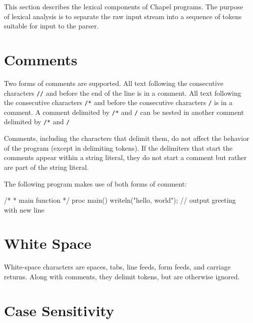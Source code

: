 \label{Lexical_Structure}

This section describes the lexical components of Chapel programs.
The purpose of lexical analysis is
to separate the raw input stream into a sequence of tokens suitable
for input to the parser.

\section{Comments}
\label{Comments}

Two forms of comments are supported.  All text following the
consecutive characters {\tt //} and before the end of the line is in a
comment.  All text following the consecutive characters {\tt /*} and
before the consecutive characters {\tt */} is in a comment.
A comment delimited by {\tt /*} and {\tt */} can be nested in
another comment delimited by {\tt /*} and {\tt */}

Comments, including the characters that delimit them, do not affect
the behavior of the program (except in delimiting tokens).  If the
delimiters that start the comments appear within a string literal,
they do not start a comment but rather are part of the string literal.

\begin{example}
The following program makes use of both forms of comment:
\begin{chapel}
/*
 *  main function
 */
proc main() {
  writeln("hello, world"); // output greeting with new line
}
\end{chapel}
\end{example}

\section{White Space}
\label{White_Space}

White-space characters are spaces, tabs, line feeds, form feeds, and carriage
returns.  Along with comments, they delimit tokens, but are otherwise
ignored.

\section{Case Sensitivity}
\label{Case_Sensitivity}

